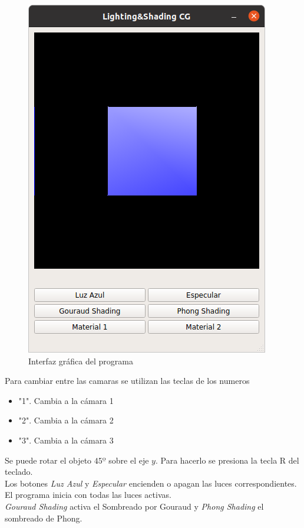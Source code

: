 \documentclass[12pt]{article}
\begin{document}
\begin{figure}[H]
\centering
\includegraphics[scale=0.5]{images/gui.png}
\caption{Interfaz gráfica del programa}
\end{figure}

Para cambiar entre las camaras se utilizan las teclas de los numeros
\begin{itemize}
\item "1". Cambia a la cámara 1
\item "2". Cambia a la cámara 2
\item "3". Cambia a la cámara 3

\end{itemize}

 

Se puede rotar el objeto $45º$ sobre el eje $y$. Para hacerlo se presiona la tecla R del teclado.
\\

Los botones \textit{Luz Azul} y \textit{Especular} encienden o apagan las luces correspondientes. El programa inicia con todas las luces activas.
\\

\textit{Gouraud Shading} activa el Sombreado por Gouraud y \textit{Phong Shading} el sombreado de Phong.
\\
\end{document}

